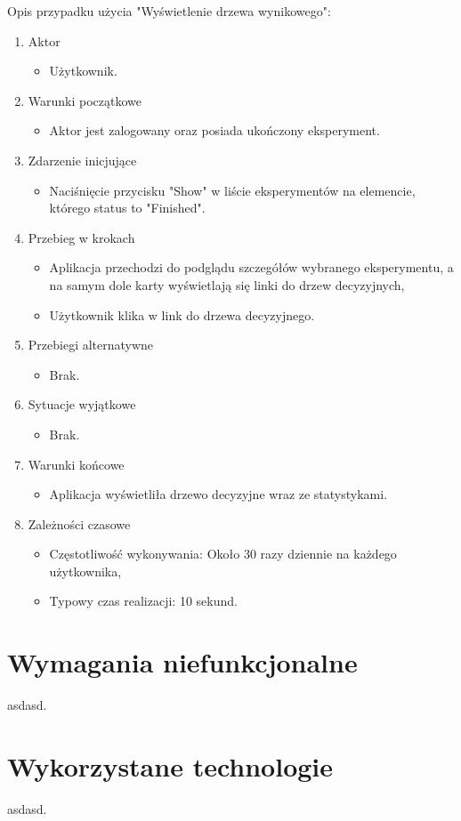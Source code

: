 Opis przypadku użycia "Wyświetlenie drzewa wynikowego":
\begin{enumerate}
	\item  Aktor
	\begin{itemize}
		\item Użytkownik. 
	\end{itemize}
	\item Warunki początkowe
	\begin{itemize}
		\item Aktor jest zalogowany oraz posiada ukończony eksperyment.
	\end{itemize}
	\item Zdarzenie inicjujące
	\begin{itemize}
		\item Naciśnięcie przycisku "Show" w liście eksperymentów na elemencie, którego status to "Finished".
	\end{itemize}
	\item Przebieg w krokach
	\begin{itemize}
		\item Aplikacja przechodzi do podglądu szczegółów wybranego eksperymentu, a na samym dole karty wyświetlają się linki do drzew decyzyjnych,
		\item Użytkownik klika w link do drzewa decyzyjnego.
	\end{itemize}
	\item Przebiegi alternatywne
	\begin{itemize}
		\item  Brak.
	\end{itemize}
	\item Sytuacje wyjątkowe
	\begin{itemize}
		\item  Brak.
	\end{itemize}
	\item Warunki końcowe
	\begin{itemize}
	\item  Aplikacja wyświetliła drzewo decyzyjne wraz ze statystykami.
	\end{itemize}
	\item Zależności czasowe
	\begin{itemize}
		\item Częstotliwość wykonywania: Około 30 razy dziennie na każdego użytkownika,
		\item Typowy czas realizacji: 10 sekund.
	\end{itemize}
\end{enumerate}

\section{Wymagania niefunkcjonalne}
asdasd.
\section{Wykorzystane technologie}
asdasd.
